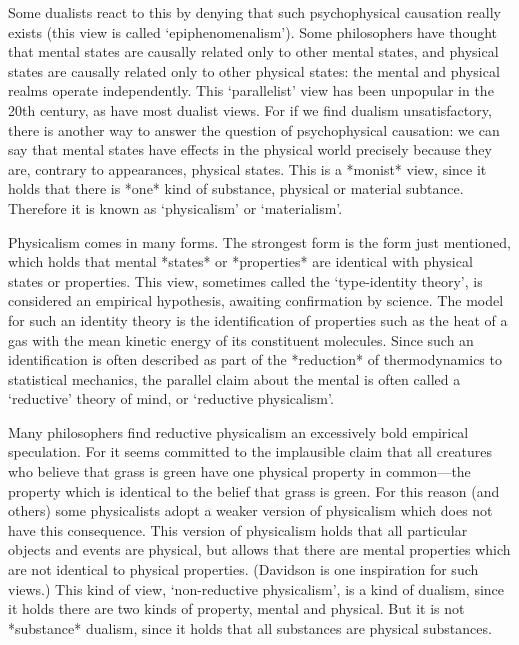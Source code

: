 Some dualists react to this by denying that such psychophysical causation really
exists (this view is called ‘epiphenomenalism’). Some philosophers have thought
that mental states are causally related only to other mental states, and physical states
are causally related only to other physical states: the mental and physical realms
operate independently. This ‘parallelist’ view has been unpopular in the 20th
century, as have most dualist views. For if we find dualism unsatisfactory, there is
another way to answer the question of psychophysical causation: we can say that
mental states have effects in the physical world precisely because they are, contrary
to appearances, physical states\autocite{Lewis1}. This is a *monist* view, since it
holds that there is *one* kind of substance, physical or material subtance. Therefore
it is known as ‘physicalism’ or ‘materialism’.

Physicalism comes in many forms. The strongest form is the form just
mentioned, which holds that mental *states* or *properties* are identical with
physical states or properties. This view, sometimes called the ‘type-identity theory’,
is considered an empirical hypothesis, awaiting confirmation by science. The model
for such an identity theory is the identification of properties such as the heat of a gas
with the mean kinetic energy of its constituent molecules. Since such an
identification is often described as part of the *reduction* of thermodynamics to
statistical mechanics, the parallel claim about the mental is often called a ‘reductive’
theory of mind, or ‘reductive physicalism’\autocite{Lewis2}.

Many philosophers find reductive physicalism an excessively bold empirical
speculation. For it seems committed to the implausible claim that all creatures who
believe that grass is green have one physical property in common—the property
which is identical to the belief that grass is green. For this reason (and others) some
physicalists adopt a weaker version of physicalism which does not have this
consequence. This version of physicalism holds that all particular objects and events
are physical, but allows that there are mental properties which are not identical to
physical properties. (Davidson\autocite{Davidson1} is one inspiration for such views.) This kind of
view, ‘non-reductive physicalism’, is a kind of dualism, since it holds there are two
kinds of property, mental and physical. But it is not *substance* dualism, since it
holds that all substances are physical substances.

